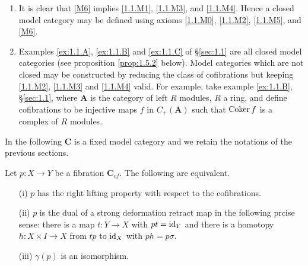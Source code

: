 \documentclass[../main]{subfiles}
\begin{document}
\begin{remarks*}
\begin{enumerate}
    \item It is clear that \ref{M6} implies \ref{1.1.M1}, \ref{1.1.M3}, and \ref{1.1.M4}. Hence a closed model category may be defined using axioms \ref{1.1.M0}, \ref{1.1.M2}, \ref{1.1.M5}, and \ref{M6}.
    \item Examples \ref{ex:1.1.A}, \ref{ex:1.1.B} and \ref{ex:1.1.C} of \S\ref{sec:1.1} are all closed model categories (see proposition \ref{prop:1.5.2} below). Model categories which are not closed may be constructed by reducing the class of cofibrations but keeping \ref{1.1.M2}, \ref{1.1.M3} and \ref{1.1.M4} valid. For example, take example \ref{ex:1.1.B}, \S\ref{sec:1.1}, where $\mathbf A$ is the category of left $R$ modules, $R$ a ring, and define cofibrations to be injective maps $f$ in $C_+(\mathbf A)$ such that $\operatorname{Coker} f$ is a complex of  $R$ modules.
\end{enumerate} 
\end{remarks*} 

In the following $\mathbf C$ is a fixed model category and we retain the notations of the previous sections.

\begin{lemma}\label{lem:1.5.1}
Let $p : X \longrightarrow Y$ be a fibration $\mathbf C_{cf}$. The following are equivalent.
\begin{itemize}
    \item[(i)] $p$ has the right lifting property with respect to the cofibrations.
    \item[(ii)] $p$ is the dual of a strong deformation retract map in the following prcise sense: there is a map $t : Y \longrightarrow X$ with $pt = \operatorname{id}_Y$ and there is a homotopy $h : X \times I \longrightarrow X$ from $tp$ to $\operatorname{id}_X$ with $ph = p\sigma$. 
    \item[(iii)] $\gamma(p)$ is an isomorphism. 
\end{itemize}
\end{lemma} 
\end{document}
